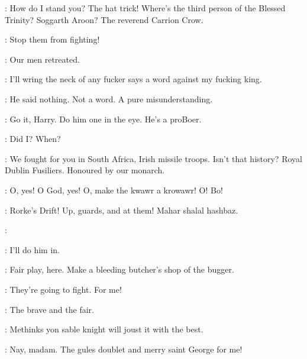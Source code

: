 \Stephen:
How do I stand you?
The hat trick!
Where's the third person of the Blessed Trinity?
Soggarth Aroon?
The reverend Carrion Crow.

\Cissy:
Stop them from fighting!

\ARough:
Our men retreated.

\Carr:
I'll wring the neck of any fucker says a word against my fucking king.

\Bloom:
He said nothing.
Not a word.
A pure misunderstanding.

\Compton:
Go it, Harry.
Do him one in the eye.
He's a proBoer.

\Stephen:
Did I?
When?

\Bloom:
We fought for you in South Africa, Irish missile troops.
Isn't that history?
Royal Dublin Fusiliers.
Honoured by our monarch.

\Navvy:
O, yes!
O God, yes!
O, make the kwawr a krowawr!
O! Bo!%


\MajorTweedy:
Rorke's Drift!
Up, guards, and at them!
Mahar shalal hashbaz.

\Citizen:


\Carr:
I'll do him in.

\Compton:
Fair play, here.
Make a bleeding butcher's shop of the bugger.


\Cissy:
They're going to fight.
For me!

\CuntyKate:
The brave and the fair.

\BiddyClap:
Methinks yon sable knight will joust it with the best.

\CuntyKate:
Nay, madam.
The gules doublet and merry saint George for me!

